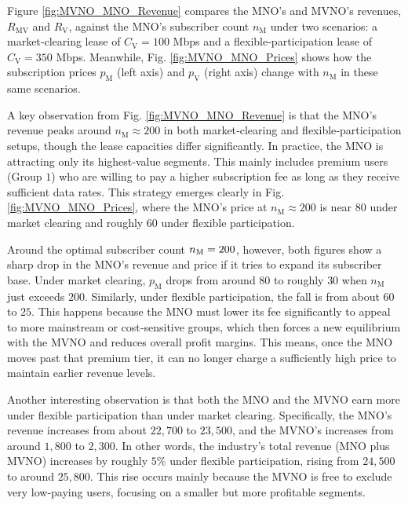 \documentclass[12pt, draftclsnofoot, onecolumn]{IEEEtran}
\begin{document}
		

		
		
		Figure \ref{fig:MVNO_MNO_Revenue} compares the MNO’s and MVNO’s revenues, \(R_{\mathrm{MV}}\) and \(R_{\mathrm{V}}\), against the MNO’s subscriber count \(n_{\mathrm{M}}\) under two scenarios: a market‐clearing lease of $C_{\mathrm{V}}=100$ Mbps and a flexible‐participation lease of \(C_{\mathrm{V}}=350\) Mbps.  Meanwhile, Fig. \ref{fig:MVNO_MNO_Prices} shows how the subscription prices \(p_{\mathrm{M}}\) (left axis) and \(p_{\mathrm{V}}\) (right axis) change with \(n_{\mathrm{M}}\) in these same scenarios.
		
		A key observation from Fig. \ref{fig:MVNO_MNO_Revenue} is that the MNO’s revenue peaks around \(n_{\mathrm{M}}\approx200\) in both market‐clearing and flexible‐participation setups, though the lease capacities differ significantly. In practice, the MNO is attracting only its highest‐value segments. This mainly includes premium users (Group $1$) who are willing to pay a higher subscription fee as long as they receive sufficient data rates. This strategy emerges clearly in Fig. \ref{fig:MVNO_MNO_Prices}, where the MNO’s price at \(n_{\mathrm{M}}\approx200\) is near $80$ under market clearing and roughly $60$ under flexible participation.
		

		
		
		Around the optimal subscriber count $n_{\rm M}=200$, however, both figures show a sharp drop in the MNO’s revenue and price if it tries to expand its subscriber base.  Under market clearing, \(p_{\mathrm{M}}\) drops from around $80$ to roughly $30$ when \(n_{\mathrm{M}}\) just exceeds $200$. Similarly, under flexible participation, the fall is from about $60$ to $25$.  This happens because the MNO must lower its fee significantly to appeal to more mainstream or cost‐sensitive groups, which then forces a new equilibrium with the MVNO and reduces overall profit margins.  This means, once the MNO moves past that premium tier, it can no longer charge a sufficiently high price to maintain earlier revenue levels.
		
		
		Another interesting observation is that both the MNO and the MVNO earn more under flexible participation than under market clearing.  Specifically, the MNO’s revenue increases from about $22{,}700$ to $23{,}500$, and the MVNO’s increases from around $1{,}800$ to $2{,}300$.  In other words, the industry’s total revenue (MNO plus MVNO) increases by roughly $5\%$ under flexible participation, rising from $24{,}500$ to around $25{,}800$.  This rise occurs mainly because the MVNO is free to exclude very low‐paying users, focusing on a smaller but more profitable segments.  
		
\end{document}
